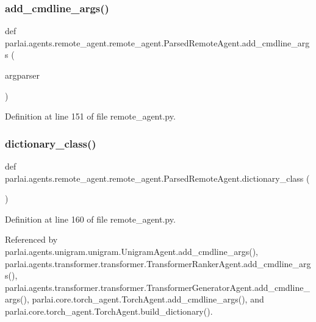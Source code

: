 \subsubsection{\texorpdfstring{add\+\_\+cmdline\+\_\+args()}{add\_cmdline\_args()}}
{\footnotesize\ttfamily def parlai.\+agents.\+remote\+\_\+agent.\+remote\+\_\+agent.\+Parsed\+Remote\+Agent.\+add\+\_\+cmdline\+\_\+args (\begin{DoxyParamCaption}\item[{}]{argparser }\end{DoxyParamCaption})\hspace{0.3cm}{\ttfamily [static]}}



Definition at line 151 of file remote\+\_\+agent.\+py.

\mbox{\label{classparlai_1_1agents_1_1remote__agent_1_1remote__agent_1_1ParsedRemoteAgent_a5759817c6b1d248a0b64861222745f62}} 
\subsubsection{\texorpdfstring{dictionary\+\_\+class()}{dictionary\_class()}}
{\footnotesize\ttfamily def parlai.\+agents.\+remote\+\_\+agent.\+remote\+\_\+agent.\+Parsed\+Remote\+Agent.\+dictionary\+\_\+class (\begin{DoxyParamCaption}{ }\end{DoxyParamCaption})\hspace{0.3cm}{\ttfamily [static]}}



Definition at line 160 of file remote\+\_\+agent.\+py.



Referenced by parlai.\+agents.\+unigram.\+unigram.\+Unigram\+Agent.\+add\+\_\+cmdline\+\_\+args(), parlai.\+agents.\+transformer.\+transformer.\+Transformer\+Ranker\+Agent.\+add\+\_\+cmdline\+\_\+args(), parlai.\+agents.\+transformer.\+transformer.\+Transformer\+Generator\+Agent.\+add\+\_\+cmdline\+\_\+args(), parlai.\+core.\+torch\+\_\+agent.\+Torch\+Agent.\+add\+\_\+cmdline\+\_\+args(), and parlai.\+core.\+torch\+\_\+agent.\+Torch\+Agent.\+build\+\_\+dictionary().

